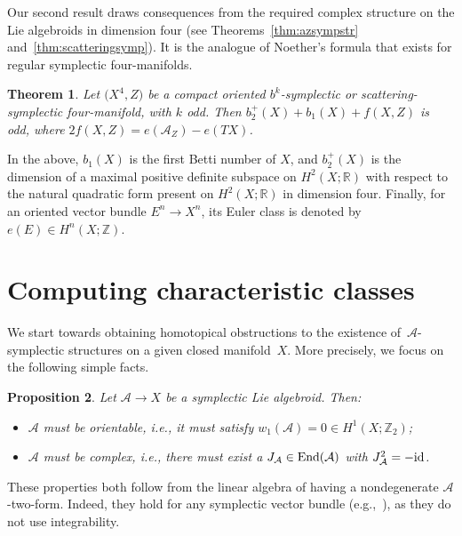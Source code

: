 \documentclass[pdftex]{sigma}
\numberwithin{equation}{section}
\newtheorem{Theorem}{Theorem}[section]
\newtheorem{Proposition}[Theorem]{Proposition}
 { \theoremstyle{definition}
\newtheorem{Definition}[Theorem]{Definition}
\newtheorem{Example}[Theorem]{Example}
\newtheorem{Remark}[Theorem]{Remark} }
\begin{document}
Our second result draws consequences from the required complex structure on the Lie algebroids in dimension four (see Theorems~\ref{thm:azsympstr} and~\ref{thm:scatteringsymp}). It is the analogue of Noether's formula \cite[Theorem~1.4.13]{GompfStipsicz99} that exists for regular symplectic four-manifolds.

\begin{Theorem}\label{thm:intrologsymp} Let $\big(X^4,Z\big)$ be a compact oriented $b^k$-symplectic or scattering-symplectic four-manifold, with $k$ odd. Then $b_2^+(X) + b_1(X) + f(X,Z)$ is odd, where $2 f(X,Z) = e(\mathcal{A}_Z) - e(TX)$.
\end{Theorem}

In the above, $b_1(X)$ is the first Betti number of $X$, and $b_2^+(X)$ is the dimension of a maximal positive definite subspace on $H^2(X;\mathbb{R})$ with respect to the natural quadratic form present on $H^2(X;\mathbb{R})$ in dimension four. Finally, for an oriented vector bundle $E^n \to X^n$, its Euler class is denoted by $e(E) \in H^n(X;\mathbb{Z})$.

\section{Computing characteristic classes}\label{sec:homotopical}

We start towards obtaining homotopical obstructions to the existence of~$\mathcal{A}$-symplectic structures on a given closed manifold~$X$. More precisely, we focus on the following simple facts.

\begin{Proposition}\label{prop:symplaconsequences} Let $\mathcal{A} \to X$ be a symplectic Lie algebroid. Then:
	\begin{itemize}\itemsep=0pt
	\item $\mathcal{A}$ must be orientable, i.e., it must satisfy $w_1(\mathcal{A}) = 0 \in H^1(X;\mathbb{Z}_2)$;
	\item $\mathcal{A}$ must be complex, i.e., there must exist a $J_\mathcal{A} \in {\rm End}(\mathcal{A})$ with $J_\mathcal{A}^2 = - {\rm id}$.
	\end{itemize}
\end{Proposition}

These properties both follow from the linear algebra of having a nondegenerate $\mathcal{A}$-two-form. Indeed, they hold for any symplectic vector bundle (e.g.,~\cite{McDuffSalamon17}), as they do not use integrability.
\end{document}
